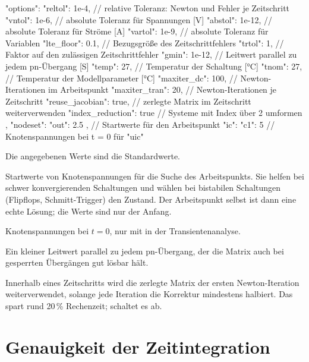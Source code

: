 \begin{json}
"options": {
  "reltol": 1e-4,       // relative Toleranz: Newton und Fehler je Zeitschritt
  "vntol": 1e-6,        // absolute Toleranz für Spannungen [V]
  "abstol": 1e-12,      // absolute Toleranz für Ströme [A]
  "vartol": 1e-9,       // absolute Toleranz für Variablen
  "lte_floor": 0.1,     // Bezugsgröße des Zeitschrittfehlers
  "trtol": 1,           // Faktor auf den zulässigen Zeitschrittfehler
  "gmin": 1e-12,        // Leitwert parallel zu jedem pn-Übergang [S]
  "temp": 27,           // Temperatur der Schaltung [°C]
  "tnom": 27,           // Temperatur der Modellparameter [°C]
  "maxiter_dc": 100,    // Newton-Iterationen im Arbeitspunkt
  "maxiter_tran": 20,   // Newton-Iterationen je Zeitschritt
  "reuse_jacobian": true,   // zerlegte Matrix im Zeitschritt weiterverwenden
  "index_reduction": true   // Systeme mit Index über 2 umformen
},
"nodeset": { "out": 2.5 },   // Startwerte für den Arbeitspunkt
"ic": { "c1": 5 }            // Knotenspannungen bei t = 0 für "uic"
\end{json}

Die angegebenen Werte sind die Standardwerte.

\begin{description}[style=nextline,leftmargin=2em]
  \item[{\code{nodeset}}]
    Startwerte von Knotenspannungen für die Suche des Arbeitspunkts. Sie
    helfen bei schwer konvergierenden Schaltungen und wählen bei bistabilen
    Schaltungen (Flipflops, Schmitt-Trigger) den Zustand. Der Arbeitspunkt
    selbst ist dann eine echte Lösung; die Werte sind nur der Anfang.
  \item[{\code{ic}}]
    Knotenspannungen bei $t=0$, nur mit  in der
    Transientenanalyse.
  \item[{\code{gmin}}]
    Ein kleiner Leitwert parallel zu jedem pn-Übergang, der die Matrix auch
    bei gesperrten Übergängen gut lösbar hält.
  \item[{\code{reuse_jacobian}}]
    Innerhalb eines Zeitschritts wird die zerlegte Matrix der ersten
    Newton-Iteration weiterverwendet, solange jede Iteration die Korrektur
    mindestens halbiert. Das spart rund 20\,\% Rechenzeit; 
    schaltet es ab.
\end{description}

\section{Genauigkeit der Zeitintegration}
\label{sec:genauigkeit}

